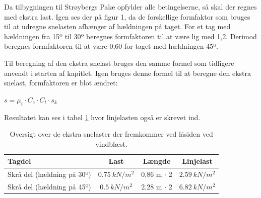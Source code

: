 Da tilbygningen til Strøybergs Palæ opfylder alle betingelserne, så skal der regnes med ekstra last.  Igen ses der på figur 1, da de forskellige formfaktor som bruges til at udregne snelasten afhænger af hældningen på taget. For et tag med hældningen fra 15º til 30º beregnes formfaktoren til at være lig med 1,2. Derimod beregnes formfaktoren til at være 0,60 for taget med hældningen 45º. 

Til beregning af den ekstra snelast bruges den samme formel som tidligere anvendt i starten af kapitlet. Igen bruges denne formel til at beregne den ekstra snelast, formfaktoren er blot ændret:

$s = \mu_i \cdot C_e  \cdot  C_t \cdot s_k$

Resultatet kan ses i tabel \ref{tab:SLT3} hvor linjelasten også er skrevet ind.

\begin{table}[H]
\centering
\begin{tabular}{|l|c|c|c|}
\hline
\textbf{Tagdel}            & \textbf{Last} & \textbf{Længde} & \textbf{Linjelast} \\ \hline
Skrå del (hældning på 30º) & $\SI{0,75}{kN/m^2}$                      & 0,86 m $\cdot$ 2              & $\SI{2,59}{kN/m^2}$                                                                                                               \\ \hline
Skrå del (hældning på 45º) & $\SI{0,5}{kN/m^2}$                                     & 2,28 m $\cdot$ 2               & $\SI{6,82}{kN/m^2}$                                                                                                              \\ \hline
\end{tabular}
\caption{Oversigt over de ekstra snelaster der fremkommer ved låsiden ved vindblæst.}
\label{tab:SLT3}
\end{table}














